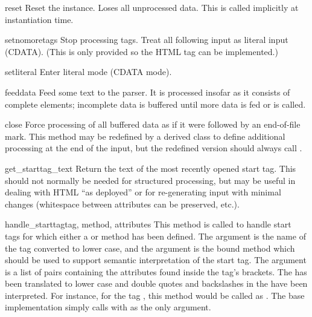 \begin{methoddesc}{reset}{}
Reset the instance.  Loses all unprocessed data.  This is called
implicitly at instantiation time.
\end{methoddesc}

\begin{methoddesc}{setnomoretags}{}
Stop processing tags.  Treat all following input as literal input
(CDATA).  (This is only provided so the HTML tag
 can be implemented.)
\end{methoddesc}

\begin{methoddesc}{setliteral}{}
Enter literal mode (CDATA mode).
\end{methoddesc}

\begin{methoddesc}{feed}{data}
Feed some text to the parser.  It is processed insofar as it consists
of complete elements; incomplete data is buffered until more data is
fed or  is called.
\end{methoddesc}

\begin{methoddesc}{close}{}
Force processing of all buffered data as if it were followed by an
end-of-file mark.  This method may be redefined by a derived class to
define additional processing at the end of the input, but the
redefined version should always call .
\end{methoddesc}

\begin{methoddesc}{get_starttag_text}{}
Return the text of the most recently opened start tag.  This should
not normally be needed for structured processing, but may be useful in
dealing with HTML ``as deployed'' or for re-generating input with
minimal changes (whitespace between attributes can be preserved,
etc.).
\end{methoddesc}

\begin{methoddesc}{handle_starttag}{tag, method, attributes}
This method is called to handle start tags for which either a
 or  method has been
defined.  The  argument is the name of the tag converted to
lower case, and the  argument is the bound method which
should be used to support semantic interpretation of the start tag.
The  argument is a list of  pairs containing the attributes found inside the tag's
\code{<>} brackets.  The  has been translated to lower case
and double quotes and backslashes in the  have been interpreted.
For instance, for the tag , this
method would be called as .  The base implementation simply calls
 with  as the only argument.
\end{methoddesc}

